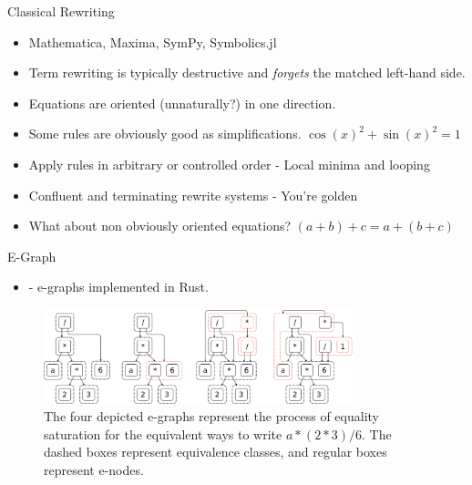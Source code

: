 \documentclass[8pt]{beamer}  %
\newcommand{\MYhref}[3][blue]{\href{#2}{\color{#1}{#3}}}%
\begin{document}



\begin{frame}{Classical Rewriting}
\begin{itemize}
\item Mathematica, Maxima, SymPy, Symbolics.jl
\item Term rewriting is typically destructive and \textit{forgets} the matched left-hand side.
\item Equations are oriented (unnaturally?) in one direction.
\item Some rules are obviously good as simplifications.  $\cos(x)^2 + \sin(x)^2 = 1$ 
\item Apply rules in arbitrary or controlled order - Local minima and looping
\item Confluent and terminating rewrite systems - You're golden 
\item What about non obviously oriented equations? $(a + b) + c = a + (b + c)$
\end{itemize}
\end{frame}

\begin{frame}[fragile]{E-Graph}


\begin{itemize}
\item \MYhref{https://egraphs-good.github.io/}{egg}  - e-graphs implemented in Rust.
\end{itemize}


\begin{figure}
    \centering
    \includegraphics[width=0.8\textwidth]{egraphs.png}
    \caption{The four depicted e-graphs represent the process of equality saturation for the equivalent ways to write $a * (2 * 3) / 6$. The dashed boxes represent equivalence classes, and regular boxes represent e-nodes.}
    \label{fig:egraph}
\end{figure}

\end{frame}
\end{document}
